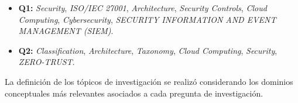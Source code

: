 \begin{itemize}
    \item \textbf{Q1:} \textit{Security}, \textit{ISO/IEC 27001}, \textit{Architecture}, \textit{Security Controls}, \textit{Cloud Computing}, \textit{Cybersecurity}, \textit{SECURITY INFORMATION AND EVENT MANAGEMENT (SIEM)}.

    \item \textbf{Q2:} \textit{Classification}, \textit{Architecture}, \textit{Taxonomy}, \textit{Cloud Computing}, \textit{Security}, \textit{ZERO-TRUST}.
\end{itemize}

La definición de los tópicos de investigación se realizó considerando los dominios conceptuales más relevantes asociados a cada pregunta de investigación.\\

